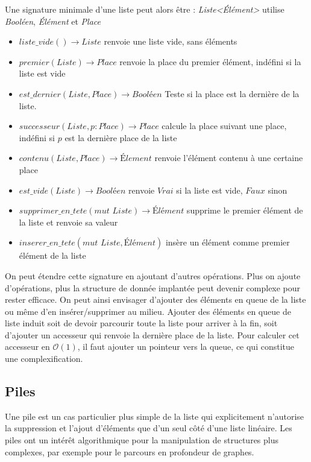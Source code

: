 \documentclass[../../../main.tex]{subfiles}
\begin{document}
Une signature minimale d'une liste peut alors être :\newline
\textit{Liste\textless Élément\textgreater} utilise \textit{Booléen}, \textit{Élément} et \textit{Place}
\begin{itemize}
	\item $liste\_vide() \rightarrow Liste$ renvoie une liste vide, sans éléments
	\item $premier(Liste)\rightarrow Place$ renvoie la place du premier élément, indéfini si la liste est vide
	\item $est\_dernier(Liste, Place)\rightarrow \textit{Booléen}$ Teste si la place est la dernière de la liste.
	\item $successeur(Liste, p:\textit{Place})\rightarrow Place$ calcule la place suivant une place, indéfini si $p$ est la dernière place de la liste
	\item $contenu(Liste,Place) \rightarrow \textit{Élement}$ renvoie l'élément contenu à une certaine place
	\item $est\_vide(Liste)\rightarrow \textit{Booléen}$ renvoie $Vrai$ si la liste est vide, $Faux$ sinon
	\item $supprimer\_en\_tete(\textit{mut Liste})\rightarrow \textit{Élément}$ supprime le premier élément de la liste et renvoie sa valeur
	\item $inserer\_en\_tete(\textit{mut Liste}, \textit{Élément})$ insère un élément comme premier élément de la liste
\end{itemize}
On peut étendre cette signature en ajoutant d'autres opérations. Plus on ajoute d'opérations, plus la structure de donnée implantée peut devenir complexe pour rester efficace. On peut ainsi envisager d'ajouter des éléments en queue de la liste ou même d'en insérer/supprimer au milieu. \newline
Ajouter des éléments en queue de liste induit soit de devoir parcourir toute la liste pour arriver à la fin, soit d'ajouter un accesseur qui renvoie la dernière place de la liste. Pour calculer cet accesseur en $\mathcal{O}(1)$, il faut ajouter un pointeur vers la queue, ce qui constitue une complexification.
\subsection{Piles}
Une pile est un cas particulier plus simple de la liste qui explicitement n'autorise la suppression et l'ajout d'éléments que d'un seul côté d'une liste linéaire. Les piles ont un intérêt algorithmique pour la manipulation de structures plus complexes, par exemple pour le parcours en profondeur de graphes.
\end{document}
